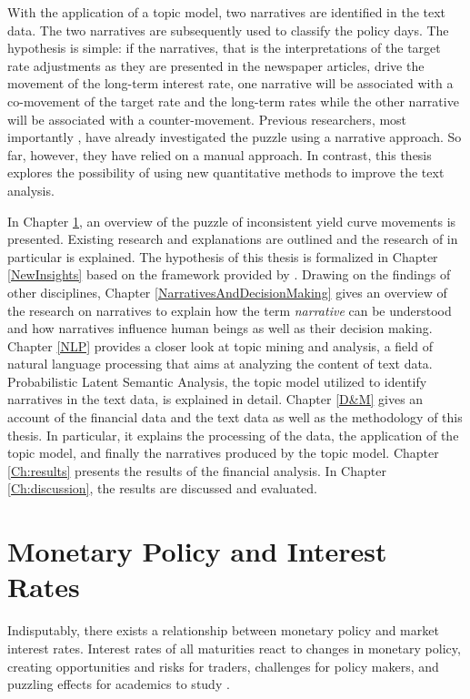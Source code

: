 \documentclass[11pt,a4paper,english,oneside]{book}
\numberwithin{equation}{chapter}
\begin{document}
With the application of a topic model, two narratives are identified in the text data. The two narratives are subsequently used to classify the policy days. The hypothesis is simple: if the narratives, that is the interpretations of the target rate adjustments as they are presented in the newspaper articles, drive the movement of the long-term interest rate, one narrative will be associated with a co-movement of the target rate and the long-term rates while the other narrative will be associated with a counter-movement. Previous researchers, most importantly \citet{Ellingsen.2003}, have already investigated the puzzle using a narrative approach. So far, however, they have relied on a manual approach. In contrast, this thesis explores the possibility of using new quantitative methods to improve the text analysis. 

In Chapter \ref{MonetaryPolicy}, an overview of the puzzle of inconsistent yield curve movements is presented. Existing research and explanations are outlined and the research of \citet{Ellingsen.2003} in particular is explained. The hypothesis of this thesis is formalized in Chapter \ref{NewInsights} based on the framework provided by \citet{Ellingsen.2003}.
Drawing on the findings of other disciplines, Chapter \ref{NarrativesAndDecisionMaking} gives an overview of the research on narratives to explain how the term \textit{narrative} can be understood and how narratives influence human beings as well as their decision making.
Chapter \ref{NLP} provides a closer look at topic mining and analysis, a field of natural language
processing that aims at analyzing the content of text data. Probabilistic Latent Semantic Analysis, the topic model utilized to identify narratives in the text data, is explained in detail. 
Chapter \ref{D&M} gives an account of the financial data and the text data as well as the methodology of this thesis. In particular, it explains the processing of the data, the application of the topic model, and finally the narratives produced by the topic model. 
Chapter \ref{Ch:results} presents the results of the financial analysis. In Chapter \ref{Ch:discussion}, the results are discussed and evaluated.



\chapter{Monetary Policy and Interest Rates} \label{MonetaryPolicy}
 
\noindent Indisputably, there exists a relationship between monetary policy and market interest rates. Interest rates of all maturities react to changes in monetary policy, creating opportunities and risks for traders, challenges for policy makers, and puzzling effects for academics to study \citep[p. 1594]{Ellingsen.2001}. 
\end{document}
